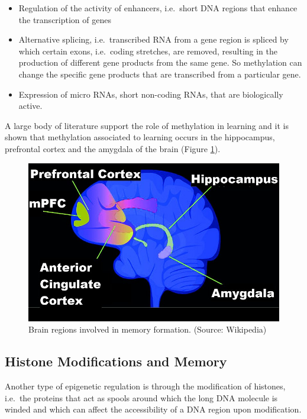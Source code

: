 \documentclass[
  11pt,
]{book}
\providecommand{\tightlist}{%
  \setlength{\itemsep}{0pt}\setlength{\parskip}{0pt}}
\begin{document}
\begin{itemize}
\tightlist
\item
  Regulation of the activity of enhancers, i.e.~short DNA regions that enhance the transcription of genes
\item
  Alternative splicing, i.e.~transcribed RNA from a gene region is spliced by which certain exons, i.e.~coding stretches, are removed, resulting in the production of different gene products from the same gene. So methylation can change the specific gene products that are transcribed from a particular gene.
\item
  Expression of micro RNAs, short non-coding RNAs, that are biologically active.
\end{itemize}

A large body of literature support the role of methylation in learning and it is shown that methylation associated to learning occurs in the hippocampus, prefrontal cortex and the amygdala of the brain (Figure \ref{fig:brainRegionsLearning}).

\begin{figure}

{\centering \includegraphics[width=0.5\linewidth]{./figs/Brain_regions_in_memory_formation} 

}

\caption{Brain regions involved in memory formation. (Source: Wikipedia)}\label{fig:brainRegionsLearning}
\end{figure}

\hypertarget{histone-modifications-and-memory}{%
\subsection{Histone Modifications and Memory}\label{histone-modifications-and-memory}}

Another type of epigenetic regulation is through the modification of histones, i.e.~the proteins that act as spools around which the long DNA molecule is winded and which can affect the accessibility of a DNA region upon modification.
\end{document}
